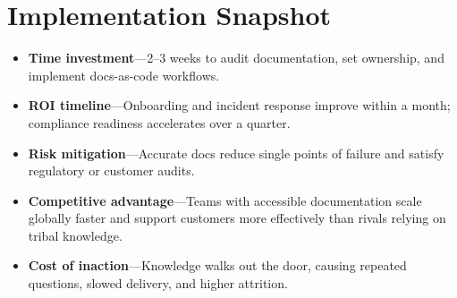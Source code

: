 \section{Implementation Snapshot}
\label{sec:docs-snapshot}
\begin{itemize}
    \item \textbf{Time investment}—2--3 weeks to audit documentation, set ownership, and implement docs-as-code workflows.
    \item \textbf{ROI timeline}—Onboarding and incident response improve within a month; compliance readiness accelerates over a quarter.
    \item \textbf{Risk mitigation}—Accurate docs reduce single points of failure and satisfy regulatory or customer audits.
    \item \textbf{Competitive advantage}—Teams with accessible documentation scale globally faster and support customers more effectively than rivals relying on tribal knowledge.
    \item \textbf{Cost of inaction}—Knowledge walks out the door, causing repeated questions, slowed delivery, and higher attrition.
\end{itemize}
